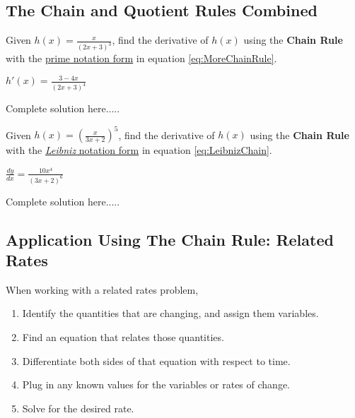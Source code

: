 \subsection*{The Chain and Quotient Rules Combined}
\begin{example}
Given $h(x)=\displaystyle\frac{x}{(2x+3)^3}$, find the derivative of $h(x)$ using the \textbf{Chain Rule} with the \underline{prime notation form} in equation \ref{eq:MoreChainRule}.

    \begin{sol}
    $h'(x)=\displaystyle\frac{3-4x}{(2x+3)^4}$
    \end{sol}
    \begin{solL}
    Complete solution here.....
    
    \end{solL}
    
\end{example}

\begin{example}
Given $h(x)=\left(\displaystyle\frac{x}{3x+2}\right)^5$, find the derivative of $h(x)$ using the \textbf{Chain Rule} with the \underline{\emph{Leibniz} notation form} in equation \ref{eq:LeibnizChain}.
    \begin{sol}
    $\displaystyle\frac{dy}{dx}=\frac{10x^4}{(3x+2)^6}$
    \end{sol}
    \begin{solL}
    Complete solution here.....
    
    \end{solL}
    
\end{example}
\newpage
\subsection*{Application Using The Chain Rule: Related Rates}
\begin{tcolorbox}[title = {Strategy for Finding Related Rates}]
When working with a related rates problem,
\begin{enumerate}
    \item Identify the quantities that are changing, and assign them variables.
    \item Find an equation that relates those quantities.
    \item Differentiate both sides of that equation with respect to time.
    \item Plug in any known values for the variables or rates of change.
    \item Solve for the desired rate.
\end{enumerate}
\end{tcolorbox}

